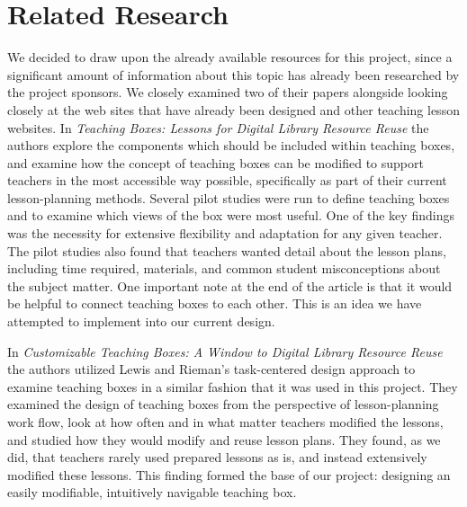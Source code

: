 \documentclass[10pt,letter]{article}
\begin{document}
\section{Related Research}
We decided to draw upon the already available resources for this project, since
a significant amount of information about this topic has already been researched
by the project sponsors.  We closely examined two of their papers alongside
looking closely at the web sites that have already been designed and other
teaching lesson websites.  In \textit{Teaching Boxes: Lessons for Digital
Library Resource Reuse}\cite{bib:khan-maull} the authors explore the components
which should be included within teaching boxes, and examine how the concept of
teaching boxes can be modified to support teachers in the most accessible way
possible, specifically as part of their current lesson-planning methods.
Several pilot studies were run to define teaching boxes and to examine which
views of the box were most useful.  One of the key findings was the necessity
for extensive flexibility and adaptation for any given teacher.  The pilot
studies also found that teachers wanted detail about the lesson plans, including
time required, materials, and common student misconceptions about the subject
matter.  One important note at the end of the article is that it would be
helpful to connect teaching boxes to each other.  This is an idea we have
attempted to implement into our current design.

In \textit{Customizable Teaching Boxes: A Window to Digital Library Resource
Reuse} \cite{bib:khan-maull2} the authors utilized Lewis and Rieman's
task-centered design approach to examine teaching boxes in a similar fashion
that it was used in this project.  They examined the design of teaching boxes
from the perspective of lesson-planning work flow, look at how often and in what
matter teachers modified the lessons, and studied how they would modify and
reuse lesson plans.  They found, as we did, that teachers rarely used prepared
lessons as is, and instead extensively modified these lessons.  This finding
formed the base of our project: designing an easily modifiable, intuitively
navigable teaching box.
\end{document}
